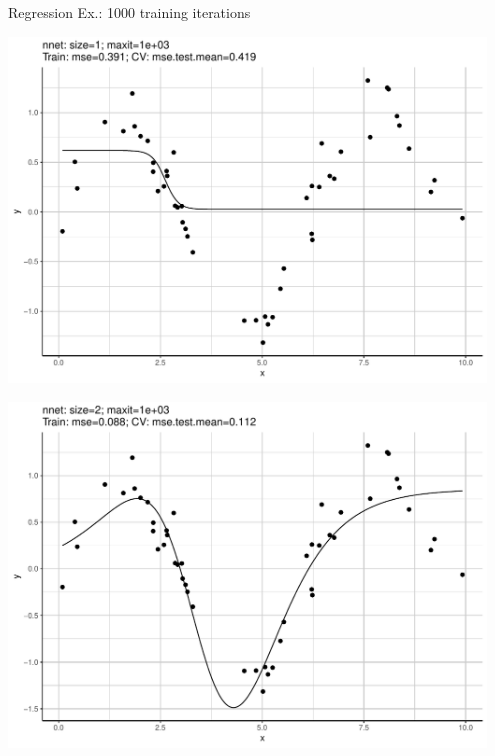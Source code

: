 \documentclass[11pt,compress,t,notes=noshow, xcolor=table]{beamer}
\begin{document}
\begin{vbframe}{Regression Ex.: 1000 training iterations}
\begin{knitrout}\scriptsize
{}\color{fgcolor}

{\centering \includegraphics[width=0.95\textwidth]{figure/unnamed-chunk-5-1} 

}




{\centering \includegraphics[width=0.95\textwidth]{figure/unnamed-chunk-5-2} 

}





\end{knitrout}
\end{vbframe}
\end{document}

